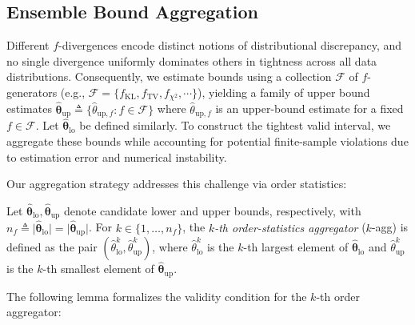 \subsection{Ensemble Bound Aggregation}\label{sec:5.1}
Different $f$-divergences encode distinct notions of distributional discrepancy, and no single divergence uniformly dominates others in tightness across all data distributions. Consequently, we estimate bounds using a collection $\mathcal{F}$ of $f$-generators (e.g., $\mathcal{F} = \{f_{\mathrm{KL}}, f_{\mathrm{TV}}, f_{\chi^2}, \cdots \}$), yielding a family of upper bound estimates $\widehat{\boldsymbol{\theta}}_{\mathrm{up}} \triangleq \{\widehat{\theta}_{\mathrm{up},f}: f \in \mathcal{F}\}$ where $\widehat{\theta}_{\mathrm{up},f}$ is an upper-bound estimate for a fixed $f \in \mathcal{F}$. Let $\widehat{\boldsymbol{\theta}}_{\mathrm{lo}}$ be defined similarly. To construct the tightest valid interval, we aggregate these bounds while accounting for potential finite-sample violations due to estimation error and numerical instability. 

Our aggregation strategy addresses this challenge via order statistics:
\begin{definition}\label{def:kth}
\normalfont
    Let $\widehat{\boldsymbol{\theta}}_{\mathrm{lo}}, \widehat{\boldsymbol{\theta}}_{\mathrm{up}}$ 
    denote candidate lower and upper bounds, respectively, with  $n_f \triangleq \lvert \widehat{\boldsymbol{\theta}}_{\mathrm{lo}} \rvert  = \lvert \widehat{\boldsymbol{\theta}}_{\mathrm{up}} \rvert$. 
    For $k \in \{1,\dots,n_f\}$, the \emph{$k$-th order-statistics aggregator} ($k$-agg) is defined as the pair $(\widehat{\theta}_{\mathrm{lo}}^{k}, \widehat{\theta}_{\mathrm{up}}^{k})$, where $\widehat{\theta}_{\mathrm{lo}}^{k}$ is the $k$-th largest element of  $\widehat{\boldsymbol{\theta}}_{\mathrm{lo}}$ and $\widehat{\theta}_{\mathrm{up}}^{k}$ is the $k$-th smallest element of $\widehat{\boldsymbol{\theta}}_{\mathrm{up}}$.
\end{definition}

The following lemma formalizes the validity condition for the $k$-th order aggregator:

